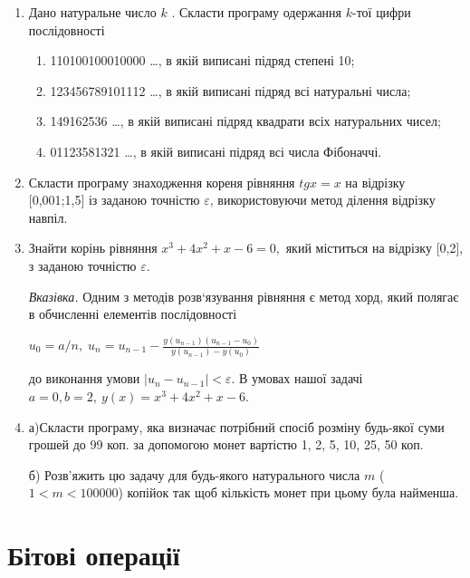\documentclass[a5paper,titlepage,openany,twoside,draft]{book_unv}%
\makeatletter
\newcommand{\xslalph}[1]{\expandafter\@xslalph\csname c@#1\endcsname}
\newcommand{\@xslalph}[1]{%
    \ifcase#1\or а\or б\or в\or г\or д\or e\or є\or ж\or з\or i%
    \or й\or к\or л\or м\or н\or о\or п\or р\or с\or т%
    \or у\or ф\or х\or ц\or ч\or ш\or ю\or я\or аа\or бб\or вв%
    \else\@ctrerr\fi%
}
\makeatother
\begin{document}
\begin{enumerate}
\def\labelenumi{\arabic{enumi})}
\setcounter{enumi}{16}
\item
  Дано натуральне число $k$ . Скласти програму одержання $k$-тої цифри послідовності
\begin{enumerate}[label=\xslalph*)]
\item 110100100010000 \ldots, в якій виписані підряд степені 10;
\item 123456789101112 \ldots , в якій виписані підряд всі натуральні числа;
\item 149162536 \ldots , в якій виписані підряд квадрати всіх натуральних
чисел;
\item 01123581321 \ldots , в якій виписані підряд всі числа Фібоначчі.

\end{enumerate}

\item
  Скласти програму знаходження кореня рівняння \(tgx = x\) на відрізку
  {[}0,001;1,5{]} із заданою точністю \(\varepsilon\), використовуючи
  метод ділення відрізку навпіл.
\item
  Знайти корінь рівняння \(x^{3} + 4x^{2} + x - 6 = 0,\) який міститься
  на відрізку {[}0,2{]}, з заданою точністю \(\varepsilon\).

\emph{\emph{Вказівка.}} Одним з методів розв`язування рівняння є метод
хорд, який полягає в обчисленні елементів послідовності 

\(u_{0} = a / n, \;  u_{n} = u_{n-1} - \frac{y(u_{n-1}) (u_{n-1} -u_{0})}{y(u_{n-1}) -y(u_{0})} \) 

до виконання умови \(\left| u_{n} - u_{n - 1} \right| < \varepsilon\). В
умовах нашої задачі \(a = 0,b = 2,\ y(x) = x^{3} + 4x^{2} + x - 6.\)

\item
  а)Скласти програму, яка визначає потрібний спосіб розміну будь-якої
  суми грошей до 99 коп. за допомогою монет вартістю 1, 2, 5, 10, 25, 50
  коп.

  б) Розв'яжить цю задачу для будь-якого натурального числа $m$
($1 <m<100000$) копійок так щоб кількість монет при
цьому була найменша.
\end{enumerate}

\chapter{Бітові операції }
%
\end{document}
